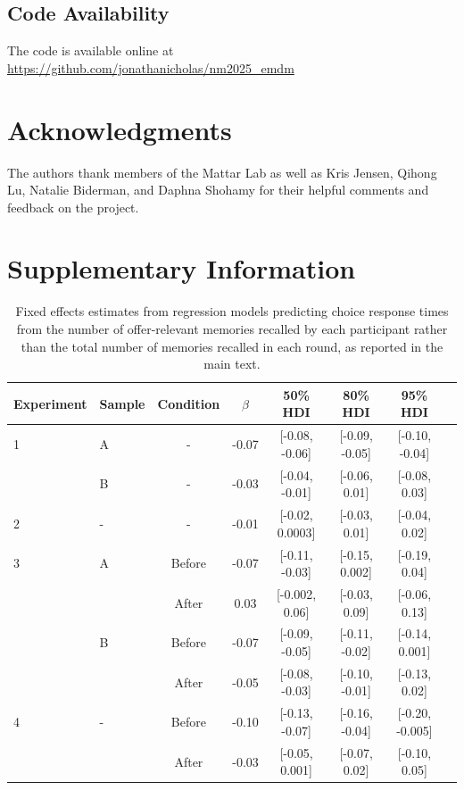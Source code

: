 \documentclass[10pt,letterpaper]{article}
\begin{document}
\subsection{Code Availability}
The code is available online at \url{https://github.com/jonathanicholas/nm2025_emdm}




\section{Acknowledgments}
The authors thank members of the Mattar Lab as well as Kris Jensen, Qihong Lu, Natalie Biderman, and Daphna Shohamy for their helpful comments and feedback on the project.


\onecolumn  %
\setcounter{figure}{0}
\setcounter{table}{0}
\renewcommand{\thefigure}{S\arabic{figure}}
\renewcommand{\thetable}{S\arabic{table}}

\section{Supplementary Information}

\begin{table}[h!]
\centering
\begin{tabular}{llcccccc}
\hline
Experiment & Sample & Condition & $\beta$ & 50\% HDI & 80\% HDI & 95\% HDI \\
\hline
1 & A & - & -0.07 & [-0.08, -0.06] & [-0.09, -0.05] & [-0.10, -0.04] \\
  & B & - & -0.03 & [-0.04, -0.01] & [-0.06, 0.01] & [-0.08, 0.03] \\
2 & - & - & -0.01 & [-0.02, 0.0003] & [-0.03, 0.01] & [-0.04, 0.02] \\
\hline
3 & A & Before & -0.07 & [-0.11, -0.03] & [-0.15, 0.002] & [-0.19, 0.04] \\
  &   & After & 0.03 & [-0.002, 0.06] & [-0.03, 0.09] & [-0.06, 0.13] \\
  & B & Before & -0.07 & [-0.09, -0.05] & [-0.11, -0.02] & [-0.14, 0.001] \\
  &   & After & -0.05 & [-0.08, -0.03] & [-0.10, -0.01] & [-0.13, 0.02] \\
4 & - & Before & -0.10 & [-0.13, -0.07] & [-0.16, -0.04] & [-0.20, -0.005] \\
  &   & After & -0.03 & [-0.05, 0.001] & [-0.07, 0.02] & [-0.10, 0.05] \\
\hline
\end{tabular}
\caption{Fixed effects estimates from regression models predicting choice response times from the number of offer-relevant memories recalled by each participant rather than the total number of memories recalled in each round, as reported in the main text.}
\label{tab:suppRT}
\end{table}
\end{document}
